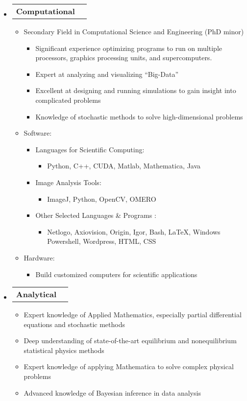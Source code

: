 \documentclass[letterpaper,11pt]{article}
\makeatletter
\newcommand{\resitem}[1]{\item #1 \vspace{-2pt}}
\newcommand{\award}[2]{\vspace{-5pt}
\begin{tabular*}{7.0in}{l@{\extracolsep{\fill}}r}
		\textbf{#1} & #2 
\end{tabular*}\vspace{-8pt}}
\makeatother
\begin{document}
\begin{itemize}

\item \award{Computational}{}

\begin{itemize}

\resitem{Secondary Field in Computational Science and Engineering (PhD minor)}
	\begin{itemize}
	\resitem{Significant experience optimizing programs to run on multiple processors, graphics processing units, and supercomputers.}
	\resitem{Expert at analyzing and visualizing ``Big-Data''}
	\resitem{Excellent at designing and running simulations to gain insight into complicated problems}
	\resitem{Knowledge of stochastic methods to solve high-dimensional problems}
	\end{itemize}

\resitem{Software:}

\begin{itemize}

	\resitem{Languages for Scientific Computing:} 
		\begin{itemize}
		\resitem{Python, C++, CUDA, Matlab, Mathematica, Java}
		\end{itemize}
		
	\resitem{Image Analysis Tools:}
		\begin{itemize}
		\resitem{ImageJ, Python, OpenCV, OMERO}
		\end{itemize}
	
	\resitem{Other Selected Languages \& Programs}:
		\begin{itemize}
		\resitem{Netlogo, Axiovision, Origin, Igor, Bash, \LaTeX, Windows Powershell, Wordpress, HTML, CSS}
		\end{itemize}
	
\end{itemize}

\resitem{Hardware:} 
	\begin{itemize}
	\resitem{Build customized computers for scientific applications}
	\end{itemize}

\end{itemize}

\item \award{Analytical}{}
\begin{itemize}
	\resitem{Expert knowledge of Applied Mathematics, especially partial differential equations and stochastic methods}
	\resitem{Deep understanding of state-of-the-art equilibrium and nonequilibrium statistical physics methods}
	\resitem{Expert knowledge of applying Mathematica to solve complex physical problems}
	\resitem{Advanced knowledge of Bayesian inference in data analysis}
\end{itemize}




\end{itemize}
\end{document}
